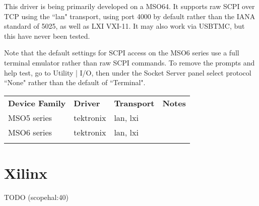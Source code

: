 This driver is being primarily developed on a MSO64. It supports raw SCPI over TCP using the ``lan" transport,
using port 4000 by default rather than the IANA standard of 5025, as well as LXI VXI-11. It may also work via USBTMC,
but this have never been tested.

Note that the default settings for SCPI access on the MSO6 series use a full terminal emulator rather than raw SCPI
commands. To remove the prompts and help test, go to Utility | I/O, then under the Socket Server panel select protocol
``None" rather than the default of ``Terminal".

\begin{tabularx}{16cm}{lllX}
\thickhline
\textbf{Device Family} & \textbf{Driver} & \textbf{Transport} & \textbf{Notes} \\
\thickhline
MSO5 series & tektronix & lan, lxi &  \\
\thickhline
MSO6 series & tektronix & lan, lxi &  \\
\thickhline
\end{tabularx}

\section{Xilinx}
TODO (scopehal:40)
